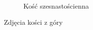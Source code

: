 \begin{figure}[H]
\begin{subfigure}{.3\textwidth}
        \caption{\label{fig:k16}Kość szesnastościenna}
      \end{subfigure}
    \caption{Zdjęcia kości z góry}
    \end{figure}